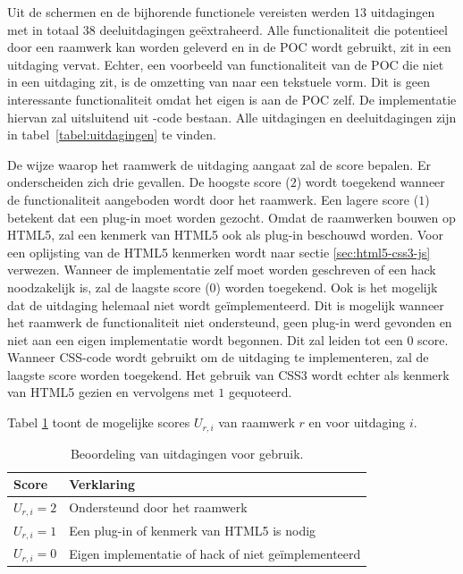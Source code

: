 Uit de  schermen en de bijhorende functionele vereisten werden $13$ uitdagingen met in totaal $38$ deeluitdagingen geëxtraheerd.
Alle functionaliteit die potentieel door een raamwerk kan worden geleverd en in de POC wordt gebruikt, zit in een uitdaging vervat.  
Echter, een voorbeeld van functionaliteit van de POC die niet in een uitdaging zit, is de omzetting van  naar een tekstuele vorm.
Dit is geen interessante functionaliteit omdat het eigen is aan de POC zelf.
De implementatie hiervan zal uitsluitend uit \js{}-code bestaan.
Alle uitdagingen en deeluitdagingen zijn in tabel~\ref{tabel:uitdagingen} te vinden.


De wijze waarop het raamwerk de uitdaging aangaat zal de score bepalen.
Er onderscheiden zich drie gevallen.
De hoogste score ($2$) wordt toegekend wanneer de functionaliteit aangeboden wordt door het raamwerk. 
Een lagere score ($1$) betekent dat een plug-in moet worden gezocht.
Omdat de raamwerken bouwen op HTML5, zal een kenmerk van HTML5 ook als plug-in beschouwd worden.
Voor een oplijsting van de HTML5 kenmerken wordt naar sectie \ref{sec:html5-css3-js} verwezen.
Wanneer de implementatie zelf moet worden geschreven of een hack noodzakelijk is, zal de laagste score ($0$) worden toegekend.
Ook is het mogelijk  dat de uitdaging helemaal niet wordt geïmplementeerd.
Dit is mogelijk wanneer het raamwerk de functionaliteit niet ondersteund,  geen plug-in werd gevonden en niet aan een eigen implementatie wordt begonnen.
Dit zal leiden tot een $0$ score.
Wanneer CSS-code wordt gebruikt om de uitdaging te implementeren, zal de laagste score worden toegekend.
Het gebruik van CSS3 wordt echter als kenmerk van HTML5 gezien en vervolgens met $1$ gequoteerd.

Tabel \ref{tabel:scores-uitdagingen} toont de mogelijke scores $U_{r,i}$ van raamwerk $r$ en voor uitdaging $i$.
\begin{table}	
  \centering
  \begin{tabular}{ll}
    \toprule
    \textbf{Score} & \textbf{Verklaring}\\
    \midrule
    $U_{r,i} = 2$ & Ondersteund door het raamwerk\\
    $U_{r,i} = 1$ & Een plug-in of kenmerk van HTML5 is nodig\\
    $U_{r,i} = 0$ & Eigen implementatie of hack of niet geïmplementeerd\\ 
    \bottomrule
  \end{tabular}
  \caption{Beoordeling van uitdagingen voor gebruik.}
  \label{tabel:scores-uitdagingen}
\end{table}

